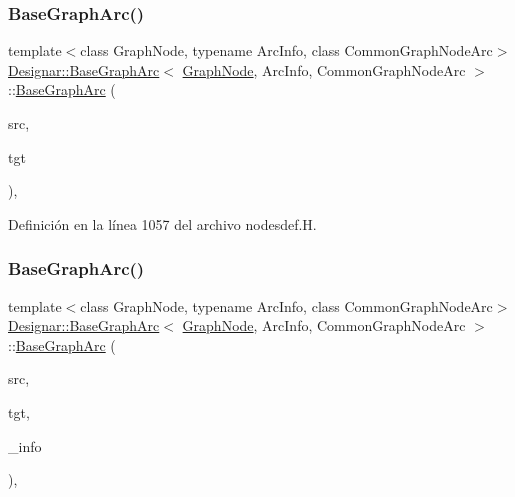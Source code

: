 \subsubsection{\texorpdfstring{Base\+Graph\+Arc()}{BaseGraphArc()}\hspace{0.1cm}{\footnotesize\ttfamily [2/4]}}
{\footnotesize\ttfamily template$<$class Graph\+Node, typename Arc\+Info, class Common\+Graph\+Node\+Arc$>$ \\
\hyperlink{class_designar_1_1_base_graph_arc}{Designar\+::\+Base\+Graph\+Arc}$<$ \hyperlink{class_designar_1_1_graph_node}{Graph\+Node}, Arc\+Info, Common\+Graph\+Node\+Arc $>$\+::\hyperlink{class_designar_1_1_base_graph_arc}{Base\+Graph\+Arc} (\begin{DoxyParamCaption}\item[{\hyperlink{class_designar_1_1_graph_node}{Graph\+Node} $\ast$}]{src,  }\item[{\hyperlink{class_designar_1_1_graph_node}{Graph\+Node} $\ast$}]{tgt }\end{DoxyParamCaption})\hspace{0.3cm}{\ttfamily [inline]}, {\ttfamily [protected]}}



Definición en la línea 1057 del archivo nodesdef.\+H.

\mbox{\label{class_designar_1_1_base_graph_arc_a013c1af0c1aadf28260b33585308f7ac}} 
\subsubsection{\texorpdfstring{Base\+Graph\+Arc()}{BaseGraphArc()}\hspace{0.1cm}{\footnotesize\ttfamily [3/4]}}
{\footnotesize\ttfamily template$<$class Graph\+Node, typename Arc\+Info, class Common\+Graph\+Node\+Arc$>$ \\
\hyperlink{class_designar_1_1_base_graph_arc}{Designar\+::\+Base\+Graph\+Arc}$<$ \hyperlink{class_designar_1_1_graph_node}{Graph\+Node}, Arc\+Info, Common\+Graph\+Node\+Arc $>$\+::\hyperlink{class_designar_1_1_base_graph_arc}{Base\+Graph\+Arc} (\begin{DoxyParamCaption}\item[{\hyperlink{class_designar_1_1_graph_node}{Graph\+Node} $\ast$}]{src,  }\item[{\hyperlink{class_designar_1_1_graph_node}{Graph\+Node} $\ast$}]{tgt,  }\item[{const Arc\+Info \&}]{\+\_\+info }\end{DoxyParamCaption})\hspace{0.3cm}{\ttfamily [inline]}, {\ttfamily [protected]}}



